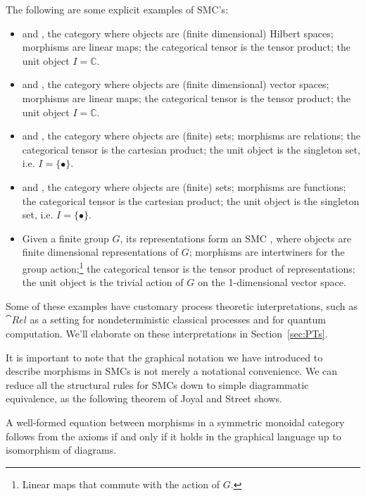 \begin{examples}
\label{ex:smcs}
The following are some explicit examples of SMC's:
\begin{itemize}
\item {} and , the category where objects are (finite dimensional) Hilbert spaces; morphisms are linear maps; the categorical tensor is the tensor product; the unit object $I=\mathbb{C}$.

\item {} and , the category where objects are (finite dimensional) vector spaces; morphisms are linear maps; the categorical tensor is the tensor product; the unit object $I=\mathbb{C}$.

\item {} and , the category where objects are (finite) sets; morphisms are relations; the categorical tensor is the cartesian product; the unit object is the singleton set, i.e. $I=\{\bullet\}$.

\item {} and , the category where objects are (finite) sets; morphisms are functions; the categorical tensor is the cartesian product; the unit object is the singleton set, i.e. $I=\{\bullet\}$.

\item Given a finite group $G$, its representations form an SMC , where objects are finite dimensional representations of $G$; morphisms are intertwiners for the group action;\footnote{Linear maps that commute with the action of $G$.} the categorical tensor is the tensor product of representations; the unit object is the trivial action of $G$ on the 1-dimensional vector space.
\end{itemize}
\end{examples}

Some of these examples have customary process theoretic interpretations, such as $\cat{Rel}$ as a setting for nondeterministic classical processes and  for quantum computation. We'll elaborate on these interpretations in Section~\ref{sec:PTs}.

It is important to note that the graphical notation we have introduced to describe morphisms in SMCs is not merely a notational convenience. We can reduce all the structural rules for SMCs down to simple diagrammatic equivalence, as the following theorem of Joyal and Street shows.

\begin{theorem}{\cite[Thm 2.3]{joyal1991geometry}}
A well-formed equation between morphisms in a symmetric monoidal category follows from the axioms if and only if it holds in the graphical language up to isomorphism of diagrams.
\end{theorem}


